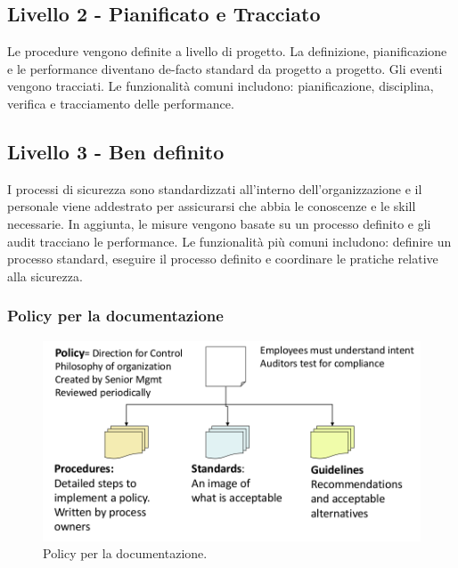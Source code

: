 \subsection{Livello 2 - Pianificato e Tracciato}

Le procedure vengono definite a livello di progetto. La definizione, 
pianificazione e le performance diventano de-facto standard da progetto a 
progetto. Gli eventi vengono tracciati. Le funzionalità comuni includono: 
pianificazione, disciplina, verifica e tracciamento delle performance.

\subsection{Livello 3 - Ben definito}

I processi di sicurezza sono standardizzati all'interno dell'organizzazione e 
il personale viene addestrato per assicurarsi che abbia le conoscenze e le 
skill necessarie. In aggiunta, le misure vengono basate su un processo 
definito e gli audit tracciano le performance. Le funzionalità più comuni 
includono: definire un processo standard, eseguire il processo definito e 
coordinare le pratiche relative alla sicurezza.


\subsubsection*{Policy per la documentazione}

\begin{figure}[h!]
        \begin{center}
                \includegraphics[scale=0.4]{res/img/documentation_policy}
        \end{center}
        \caption{Policy per la documentazione.}
\end{figure}

